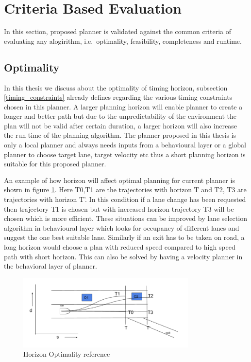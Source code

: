 \section{Criteria Based Evaluation}
In this section, proposed planner is validated against the common criteria of evaluating any alogirithm, i.e.\ optimality, feasibility, completeness and runtime.

\subsection{Optimality}
 In this thesis we discuss about the optimality of timing horizon, subsection \ref{timing_constraints} already defines regarding the various timing constraints chosen in this planner. A larger planning horizon will enable planner to create a longer and better path but due to the unpredictability of the environment the plan will not be valid after certain duration, a larger horizon will also increase the run-time of the planning algorithm. The planner proposed in this thesis is only a local planner and always needs inputs from a behavioural layer or a global planner to choose target lane, target velocity etc thus a short planning horizon is suitable for this proposed planner. 
 
 An example of how horizon will affect optimal planning for current planner is shown in figure \ref{horizon_optimality}. Here T0,T1 are the trajectories with horizon T and T2, T3 are trajectories with horizon T'. In this condition if a lane change has been requested then trajectory T1 is chosen but with increased horizon trajectory T3 will be chosen which is more efficient. These situations can be improved by lane selection algorithm in behavioural layer which looks for occupancy of different lanes and suggest the one best suitable lane. Similarly if an exit has to be taken on road, a long horizon would choose a plan with reduced speed compared to high speed path with short horizon. This can also be solved by having a velocity planner in the behavioral layer of planner.  

\begin{figure}[H]
    \centering
    \includegraphics[width=0.8\textwidth]{Images/horizaon_optimality_2.png}
    \caption{Horizon Optimality reference}
    \label{horizon_optimality}
\end{figure}
 
